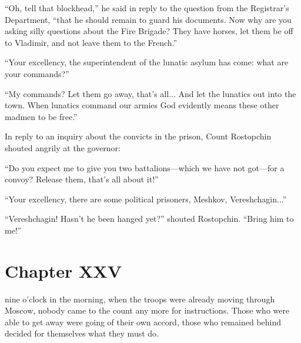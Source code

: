 ``Oh, tell that blockhead,'' he said in reply to the question
from the Registrar's Department, ``that he should remain to guard
his documents.  Now why are you asking silly questions about the
Fire Brigade? They have horses, let them be off to Vladimir, and
not leave them to the French.''

``Your excellency, the superintendent of the lunatic asylum has
come: what are your commands?''

``My commands? Let them go away, that's all... And let the
lunatics out into the town. When lunatics command our armies God
evidently means these other madmen to be free.''

In reply to an inquiry about the convicts in the prison, Count
Rostopchin shouted angrily at the governor:

``Do you expect me to give you two battalions---which we have not
got---for a convoy? Release them, that's all about it!''

``Your excellency, there are some political prisoners, Meshkov,
Vereshchagin...''

``Vereshchagin! Hasn't he been hanged yet?'' shouted
Rostopchin. ``Bring him to me!''


\chapter*{Chapter XXV} \ifaudio {}
\fi

 nine o'clock in the morning, when the troops were already
moving through Moscow, nobody came to the count any more for
instructions.  Those who were able to get away were going of
their own accord, those who remained behind decided for
themselves what they must do.

